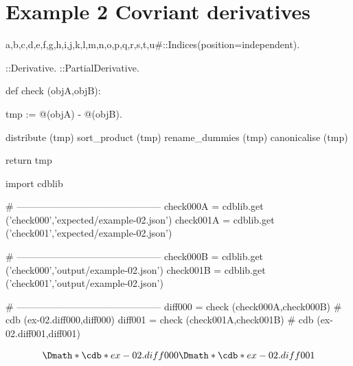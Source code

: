 \documentclass[12pt]{cdblatex}
\begin{document}
\section*{Example 2 Covriant derivatives}


\begin{cadabra}
   {a,b,c,d,e,f,g,h,i,j,k,l,m,n,o,p,q,r,s,t,u#}::Indices(position=independent).

   \nabla{#}::Derivative.
   \partial{#}::PartialDerivative.

   def check (objA,objB):

       tmp := @(objA) - @(objB).

       distribute     (tmp)
       sort_product   (tmp)
       rename_dummies (tmp)
       canonicalise   (tmp)

       return tmp

   import cdblib

   # ---------------------------------------------
   check000A = cdblib.get ('check000','expected/example-02.json')
   check001A = cdblib.get ('check001','expected/example-02.json')

   # ---------------------------------------------
   check000B = cdblib.get ('check000','output/example-02.json')
   check001B = cdblib.get ('check001','output/example-02.json')

   # ---------------------------------------------
   diff000 = check (check000A,check000B)   # cdb (ex-02.diff000,diff000)
   diff001 = check (check001A,check001B)   # cdb (ex-02.diff001,diff001)

\end{cadabra}


\begin{dgroup*}
   \Dmath*{\cdb*{ex-02.diff000}}
   \Dmath*{\cdb*{ex-02.diff001}}
\end{dgroup*}
\end{document}
